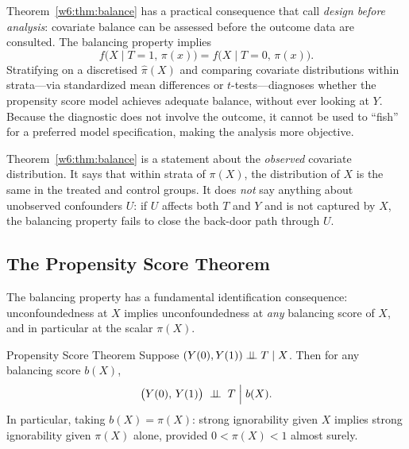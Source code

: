 \documentclass[master.tex]{subfiles}
\begin{document}
\begin{remark}
\label{w6:rem:balance-check}
Theorem~\ref{w6:thm:balance} has a practical consequence that
\citet{imbens2015causal} call \emph{design before analysis}: covariate
balance can be assessed before the outcome data are consulted.
The balancing property implies
\[
  f\bigl(X \mid T{=}1,\, \pi(x)\bigr) = f\bigl(X \mid T{=}0,\, \pi(x)\bigr).
\]
Stratifying on a discretised $\hat\pi(X)$ and comparing covariate
distributions within strata---via standardized mean differences or
$t$-tests---diagnoses whether the propensity score model achieves
adequate balance, without ever looking at $Y$.  Because the diagnostic
does not involve the outcome, it cannot be used to ``fish'' for a
preferred model specification, making the analysis more objective.
\end{remark}

\begin{remark}
\label{w6:rem:unobserved}
Theorem~\ref{w6:thm:balance} is a statement about the \emph{observed}
covariate distribution.  It says that within strata of $\pi(X)$, the
distribution of $X$ is the same in the treated and control groups.  It
does \emph{not} say anything about unobserved confounders $U$: if $U$
affects both $T$ and $Y$ and is not captured by $X$, the balancing
property fails to close the back-door path through $U$.
\end{remark}

\subsection{The Propensity Score Theorem}

The balancing property has a fundamental identification consequence:
unconfoundedness at $X$ implies unconfoundedness at \emph{any}
balancing score of $X$, and in particular at the scalar $\pi(X)$.

\begin{thm}{Propensity Score Theorem \citep{rosenbaum1983central}}
\label{w6:thm:ps}
Suppose $(Y(0), Y(1)) \perp\!\!\!\perp T \mid X$.  Then for any balancing score
$b(X)$,
\[
  \bigl(Y(0),\, Y(1)\bigr) \;\perp\!\!\!\perp\; T \;\Big|\; b(X).
\]
In particular, taking $b(X) = \pi(X)$: strong ignorability given $X$
implies strong ignorability given $\pi(X)$ alone, provided
$0 < \pi(X) < 1$ almost surely.
\end{thm}
\end{document}
